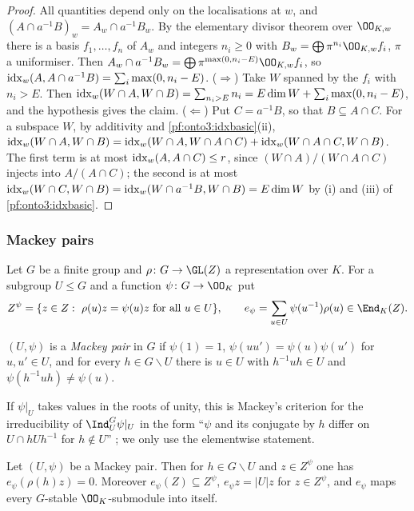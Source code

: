 \begin{proof}
All quantities depend only on the localisations at $w$, and $(A\cap a^{-1}B)_w=A_w\cap a^{-1}B_w$. By the
elementary divisor theorem over $\OO_{K,w}$ there is a basis $f_1,\dots,f_n$ of $A_w$ and integers $n_i\ge0$ with
$B_w=\bigoplus\pi^{n_i}\OO_{K,w}f_i$, $\pi$ a uniformiser. Then $A_w\cap a^{-1}B_w=\bigoplus\pi^{\max(0,n_i-E)}
\OO_{K,w}f_i$, so $\operatorname{idx}_w(A,A\cap a^{-1}B)=\sum_i\max(0,n_i-E)$.
($\Rightarrow$) Take $W$ spanned by the $f_i$ with $n_i>E$. Then $\operatorname{idx}_w(W\cap A,W\cap B)=\sum_{n_i>E}n_i
=E\dim W+\sum_i\max(0,n_i-E)$, and the hypothesis gives the claim.
($\Leftarrow$) Put $C=a^{-1}B$, so that $B\subseteq A\cap C$. For a subspace $W$, by additivity and
\cref{pf:onto3:idxbasic}(ii),
$\operatorname{idx}_w(W\cap A,W\cap B)=\operatorname{idx}_w(W\cap A,W\cap A\cap C)+\operatorname{idx}_w(W\cap A\cap C,W\cap B)$.
The first term is at most $\operatorname{idx}_w(A,A\cap C)\le r$, since $(W\cap A)/(W\cap A\cap C)$ injects into
$A/(A\cap C)$; the second is at most $\operatorname{idx}_w(W\cap C,W\cap B)=\operatorname{idx}_w(W\cap a^{-1}B,W\cap B)=
E\dim W$ by (i) and (iii) of \cref{pf:onto3:idxbasic}.
\end{proof}

\subsubsection{Mackey pairs}

Let $G$ be a finite group and $\rho\colon G\to\GL(Z)$ a representation over $K$. For a subgroup $U\le G$ and a
function $\psi\colon G\to\OO_K$ put
\[
Z^\psi=\{z\in Z:\ \rho(u)z=\psi(u)z\ \text{for all }u\in U\},\qquad
e_\psi=\sum_{u\in U}\psi(u^{-1})\rho(u)\in\End_K(Z).
\]

\begin{definition}\label{pf:onto3:defmackey}
$(U,\psi)$ is a \emph{Mackey pair} in $G$ if $\psi(1)=1$, $\psi(uu')=\psi(u)\psi(u')$ for $u,u'\in U$, and for
every $h\in G\smallsetminus U$ there is $u\in U$ with $h^{-1}uh\in U$ and $\psi(h^{-1}uh)\ne\psi(u)$.
\end{definition}

If $\psi|_U$ takes values in the roots of unity, this is Mackey's criterion for the irreducibility of
$\Ind_U^G\psi|_U$ in the form ``$\psi$ and its conjugate by $h$ differ on $U\cap hUh^{-1}$ for $h\notin U$''
\cite[\S7.4]{Serre1977}; we only use the elementwise statement.

\begin{lemma}\label{pf:onto3:orth}
Let $(U,\psi)$ be a Mackey pair. Then for $h\in G\smallsetminus U$ and $z\in Z^\psi$ one has
$e_\psi(\rho(h)z)=0$. Moreover $e_\psi(Z)\subseteq Z^\psi$, $e_\psi z=|U|z$ for $z\in Z^\psi$, and $e_\psi$
maps every $G$-stable $\OO_K$-submodule into itself.
\end{lemma}

